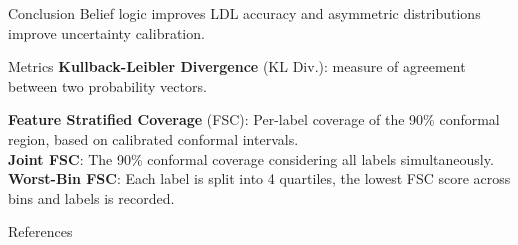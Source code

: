 \documentclass[final]{beamer}
\newlength{\sidewid}
\begin{document}
\begin{frame}
\begin{columns}[t]
\begin{column}{\sidewid} %


\begin{exampleblock}{Conclusion}
    Belief logic improves LDL accuracy and asymmetric distributions improve uncertainty calibration.
\end{exampleblock}
\begin{exampleblock}{Metrics}
\textbf{Kullback-Leibler Divergence} (KL Div.): measure of agreement between two probability vectors.

\textbf{Feature Stratified Coverage} (FSC): Per-label coverage of the 90\% conformal region, based on calibrated conformal intervals. \\
\textbf{Joint FSC}: The 90\% conformal coverage considering all labels simultaneously.\\
\textbf{Worst-Bin FSC}: Each label is split into 4 quartiles, the lowest FSC score across bins and labels is recorded.

\end{exampleblock}




\begin{exampleblock}{References}

\small{
}
\end{exampleblock}






\end{column}
\end{columns}
\end{frame}
\end{document}
